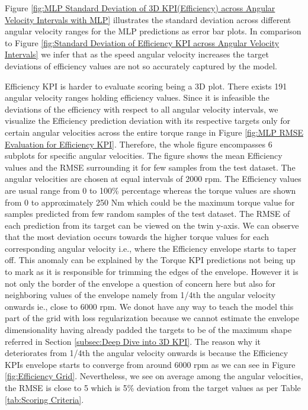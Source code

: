 \documentclass{report} %
\begin{document}
Figure \ref{fig:MLP Standard Deviation of 3D KPI(Efficiency) across Angular Velocity Intervals with MLP} illustrates the standard deviation across different 
angular velocity ranges for the \ac{MLP} predictions as error bar plots.
In comparison to Figure \ref{fig:Standard Deviation of Efficiency KPI across Angular Velocity Intervals} we infer that as the speed angular 
velocity increases the target deviations of efficiency values are not so accurately captured by the model.

Efficiency \ac{KPI} is harder to evaluate scoring being a 3\ac{D} plot. There exists 191 angular velocity ranges holding efficiency values.
Since it is infeasible the deviations of the efficiency with respect to all angular velocity intervals, we visualize the Efficiency prediction deviation 
with its respective targets only for certain angular velocities across the entire torque range in Figure \ref{fig:MLP RMSE Evaluation for Efficiency KPI}. Therefore, the 
whole figure encompasses 6 subplots for specific angular velocities.
The figure shows the mean Efficiency values and the \ac{RMSE} surrounding it for few samples from the test dataset.
The angular velocities are chosen at equal intervals of 2000 rpm. The Efficiency values are usual range from 0 to 100\% percentage whereas the torque values are shown 
from 0 to approximately 250 Nm which could be the maximum torque value for samples predicted from few random samples of the test dataset.
The \ac{RMSE} of each prediction from its target can be viewed on the twin y-axis.
We can observe that the most deviation occurs towards the higher torque values for each corresponding angular velocity i.e., where the Efficiency envelope starts to taper off.
This anomaly can be explained by the Torque \ac{KPI} predictions not being up to mark as it is responsible for trimming the edges of the envelope.
However it is not only the border of the envelope a question of concern here but also for neighboring values of the envelope namely from 1/4th the 
angular velocity onwards ie., close to 6000 rpm. 
We donot have any way to teach the model this part of the grid with loss regularization because we cannot estimate the envelope dimensionality having already padded 
the targets to be of the maximum shape referred in Section \ref{subsec:Deep Dive into 3D KPI}. The reason why it deteriorates from 1/4th the angular velocity onwards is 
because the Efficiency \ac{KPI}s envelope starts to converge from around 6000 rpm as we can see in Figure \ref{fig:Efficiency Grid}.
Nevertheless, we see on average among the angular velocities, the \ac{RMSE} is close to 5 which is 5\% deviation from the target values as per Table \ref{tab:Scoring Criteria}.
\end{document}
